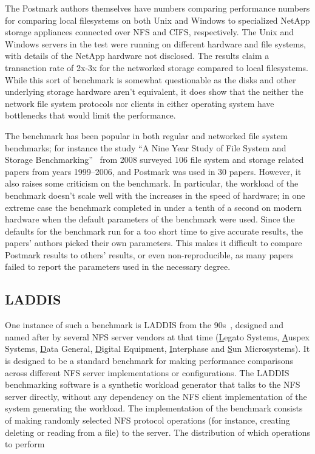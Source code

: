 The Postmark authors themselves have numbers comparing performance numbers for comparing local filesystems on both Unix and Windows
to specialized NetApp storage appliances connected over NFS and CIFS, respectively.
The Unix and Windows servers in the test were running on different hardware and file systems,
with details of the NetApp hardware not disclosed.
The results claim a transaction rate of 2x-3x for the networked storage compared to local filesystems.
While this sort of benchmark is somewhat questionable as the disks and other underlying storage hardware aren't equivalent,
it does show that the neither the network file system protocols nor clients in either operating system have
bottlenecks that would limit the performance.

The benchmark has been popular in both regular and networked file system benchmarks;
for instance the study ``A Nine Year Study of File System and Storage Benchmarking''~\cite{MetaStudy} from 2008
surveyed 106 file system and storage related papers from years 1999--2006, and Postmark was used in 30 papers.
However, it also raises some criticism on the benchmark.
In particular, the workload of the benchmark doesn't scale well with the increases in the speed of hardware;
in one extreme case the benchmark completed in under a tenth of a second on modern hardware when the default parameters
of the benchmark were used.
Since the defaults for the benchmark run for a too short time to give accurate results,
the papers' authors picked their own parameters.
This makes it difficult to compare Postmark results to others' results,
or even non-reproducible, as many papers failed to report the parameters used in the necessary degree.

\subsection{LADDIS}
One instance of such a benchmark is LADDIS from the 90s~\cite{LADDIS}, designed and named after by
several NFS server vendors at that time (\underline{L}egato Systems, \underline{A}uspex Systems, \underline{D}ata General,
\underline{D}igital Equipment, \underline{I}nterphase and \underline{S}un Microsystems).
It is designed to be a standard benchmark for making performance comparisons across different NFS server implementations
or configurations.
The LADDIS benchmarking software is a synthetic workload generator that talks to the NFS server directly,
without any dependency on the NFS client implementation of the system generating the workload.
The implementation of the benchmark consists of making randomly selected NFS protocol operations
(for instance, creating deleting or reading from a file)
to the server.
The distribution of which operations to perform

